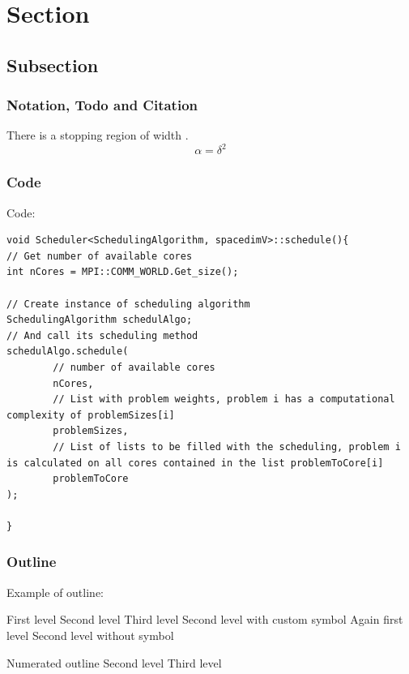 \section{Section}
\label{section}

\subsection{Subsection}
\label{subsection}

\subsubsection{Notation, Todo and Citation}
\label{notation}
There is a stopping region  of width .
\begin{equation}
    \alpha = \delta^2
\end{equation}
\cite{Muller}

\subsubsection{Code}
Code:
\begin{lstlisting}
void Scheduler<SchedulingAlgorithm, spacedimV>::schedule(){
// Get number of available cores
int nCores = MPI::COMM_WORLD.Get_size();

// Create instance of scheduling algorithm
SchedulingAlgorithm schedulAlgo;
// And call its scheduling method
schedulAlgo.schedule( 
        // number of available cores
        nCores,
        // List with problem weights, problem i has a computational complexity of problemSizes[i]
        problemSizes,
        // List of lists to be filled with the scheduling, problem i is calculated on all cores contained in the list problemToCore[i]
        problemToCore
);

}
\end{lstlisting}

\subsubsection{Outline}
Example of outline:
\begin{outline}
    \1 First level
        \2 Second level
            \3 Third level
        \2[+] Second level with custom symbol
    \1 Again first level
        \2[] Second level without symbol
\end{outline}
\begin{outline}[enumerate]
    \1 Numerated outline
        \2 Second level
            \3 Third level
\end{outline}

